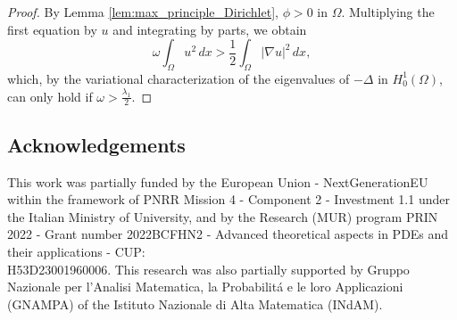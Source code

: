 \documentclass[reqno]{amsart}
\begin{document}
\begin{proof}
By Lemma \ref{lem:max_principle_Dirichlet}, $\phi > 0$ in $\Omega$. 
Multiplying the first equation by $u$ and integrating by parts, we obtain
\[
 \omega \int_\Omega u^2 \,dx > \frac{1}{2} \int_\Omega |\nabla u|^2 \,dx,
\]
which, by the variational characterization of the eigenvalues of $- \Delta$ 
in $H_0^1(\Omega)$, can only hold if $\omega > \frac{\lambda_1}{2}$.
\end{proof}

\subsection*{Acknowledgements}
This work was partially funded by the European Union - NextGenerationEU within the 
framework of PNRR Mission 4 - Component 2 - Investment 1.1 under the Italian Ministry 
of University,
and by the Research (MUR) program PRIN 2022 - Grant number 2022BCFHN2 - Advanced 
theoretical aspects in PDEs and their applications - CUP: \\ H53D23001960006.
This research was also partially supported by Gruppo Nazionale per 
l'Analisi Matematica, la Probabilit\'a e le loro Applicazioni (GNAMPA) of the 
Istituto Nazionale di Alta Matematica (INdAM).
\end{document}
